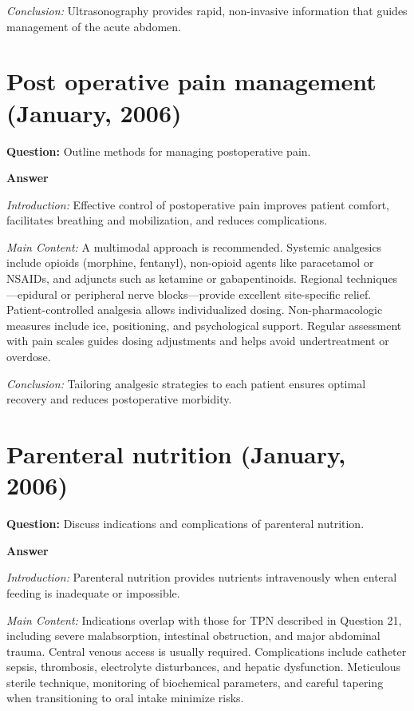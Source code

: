 \documentclass{article}
\begin{document}
\emph{Conclusion:} Ultrasonography provides rapid, non-invasive information that guides management of the acute abdomen.


\section{Post operative pain management (January, 2006)}


\textbf{Question:} Outline methods for managing postoperative pain.

\textbf{Answer}

\emph{Introduction:} Effective control of postoperative pain improves patient comfort, facilitates breathing and mobilization, and reduces complications.

\emph{Main Content:} A multimodal approach is recommended. Systemic analgesics include opioids (morphine, fentanyl), non-opioid agents like paracetamol or NSAIDs, and adjuncts such as ketamine or gabapentinoids. Regional techniques—epidural or peripheral nerve blocks—provide excellent site-specific relief. Patient-controlled analgesia allows individualized dosing. Non-pharmacologic measures include ice, positioning, and psychological support. Regular assessment with pain scales guides dosing adjustments and helps avoid undertreatment or overdose.

\emph{Conclusion:} Tailoring analgesic strategies to each patient ensures optimal recovery and reduces postoperative morbidity.


\section{Parenteral nutrition (January, 2006)}


\textbf{Question:} Discuss indications and complications of parenteral nutrition.

\textbf{Answer}

\emph{Introduction:} Parenteral nutrition provides nutrients intravenously when enteral feeding is inadequate or impossible.

\emph{Main Content:} Indications overlap with those for TPN described in Question 21, including severe malabsorption, intestinal obstruction, and major abdominal trauma. Central venous access is usually required. Complications include catheter sepsis, thrombosis, electrolyte disturbances, and hepatic dysfunction. Meticulous sterile technique, monitoring of biochemical parameters, and careful tapering when transitioning to oral intake minimize risks.
\end{document}

